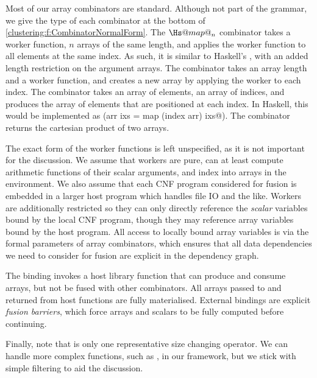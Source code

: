 Most of our array combinators are standard.
Although not part of the grammar, we give the type of each combinator at the bottom of \cref{clustering:f:CombinatorNormalForm}.
The $\Hs@map@_n$ combinator takes a worker function, $n$ arrays of the same length, and applies the worker function to all elements at the same index.
As such, it is similar to Haskell's \Hs@zipWith@, with an added length restriction on the argument arrays.
The \Hs@generate@ combinator takes an array length and a worker function, and creates a new array by applying the worker to each index.
The \Hs@gather@ combinator takes an array of elements, an array of indices, and produces the array of elements that are positioned at each index.
In Haskell, this would be implemented as (\Hs@gather arr ixs = map (index arr) ixs@).
The \Hs@cross@ combinator returns the cartesian product of two arrays. 

The exact form of the worker functions is left unspecified, as it is not important for the discussion.
We assume that workers are pure, can at least compute arithmetic functions of their scalar arguments, and index into arrays in the environment.
We also assume that each CNF program considered for fusion is embedded in a larger host program which handles file IO and the like.
Workers are additionally restricted so they can only directly reference the \emph{scalar} variables bound by the local CNF program, though they may reference array variables bound by the host program.
All access to locally bound array variables is via the formal parameters of array combinators, which ensures that all data dependencies we need to consider for fusion are explicit in the dependency graph.

The \Hs@external@ binding invokes a host library function that can produce and consume arrays, but not be fused with other combinators.
All arrays passed to and returned from host functions are fully materialised.
External bindings are explicit \emph{fusion barriers}, which force arrays and scalars to be fully computed before continuing. 

Finally, note that \Hs@filter@ is only one representative size changing operator.
We can handle more complex functions, such as \Hs@unfold@, in our framework, but we stick with simple filtering to aid the discussion.


